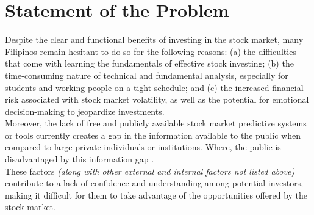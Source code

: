 \section{Statement of the Problem}
\label{sec:problem}
Despite the clear and functional benefits of investing in the stock market, 
many Filipinos remain hesitant to do so for the following reasons:
(a) the difficulties that come with learning the fundamentals 
of effective stock investing;
(b) the time-consuming nature of technical and fundamental analysis, 
especially for students and working people on a tight schedule; and
(c) the increased financial risk associated with stock market volatility, 
as well as the potential for emotional decision-making to jeopardize investments.
\\

Moreover, the lack of free and publicly available stock market predictive systems or tools 
currently creates a gap in the information available to the public when compared 
to large private individuals or institutions. Where, the public is 
disadvantaged by this information gap \cite{Kim2022}. 
\\

These factors \textit{(along with other external and internal factors not listed above)}
contribute to a lack of confidence and understanding among potential investors, 
making it difficult for them to take advantage of the opportunities offered 
by the stock market.